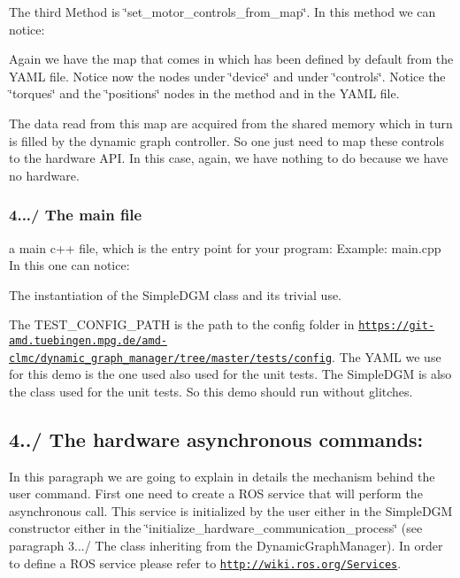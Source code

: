 The third Method is \char`\"{}set\+\_\+motor\+\_\+controls\+\_\+from\+\_\+map\char`\"{}.  In this method we can notice\+:
\begin{DoxyItemize}
\item Again we have the map that comes in which has been defined by default from the Y\+A\+ML file. Notice now the nodes under \char`\"{}device\char`\"{} and under \char`\"{}controls\char`\"{}. Notice the \char`\"{}torques\char`\"{} and the \char`\"{}positions\char`\"{} nodes in the method and in the Y\+A\+ML file.
\item The data read from this map are acquired from the shared memory which in turn is filled by the dynamic graph controller. So one just need to map these controls to the hardware A\+PI. In this case, again, we have nothing to do because we have no hardware.
\end{DoxyItemize}\hypertarget{subsubpage_implement_dgm_dgm_impl_sec_main}{}\subsubsection{4.../ The main file}\label{subsubpage_implement_dgm_dgm_impl_sec_main}
a main c++ file, which is the entry point for your program\+: Example\+: main.\+cpp  In this one can notice\+:
\begin{DoxyItemize}
\item The instantiation of the Simple\+D\+GM class and its trivial use.
\item The T\+E\+S\+T\+\_\+\+C\+O\+N\+F\+I\+G\+\_\+\+P\+A\+TH is the path to the config folder in \href{https://git-amd.tuebingen.mpg.de/amd-clmc/dynamic_graph_manager/tree/master/tests/config}{\tt https\+://git-\/amd.\+tuebingen.\+mpg.\+de/amd-\/clmc/dynamic\+\_\+graph\+\_\+manager/tree/master/tests/config}. The Y\+A\+ML we use for this demo is the one used also used for the unit tests. The Simple\+D\+GM is also the class used for the unit tests. So this demo should run without glitches.
\end{DoxyItemize}\hypertarget{subsubpage_implement_dgm_dgm_impl_sec_hwc_commands}{}\subsection{4../ The hardware asynchronous commands\+:}\label{subsubpage_implement_dgm_dgm_impl_sec_hwc_commands}
In this paragraph we are going to explain in details the mechanism behind the user command. First one need to create a R\+OS service that will perform the asynchronous call. This service is initialized by the user either in the Simple\+D\+GM constructor either in the \char`\"{}initialize\+\_\+hardware\+\_\+communication\+\_\+process\char`\"{} (see paragraph 3.../ The class inheriting from the Dynamic\+Graph\+Manager). In order to define a R\+OS service please refer to \href{http://wiki.ros.org/Services}{\tt http\+://wiki.\+ros.\+org/\+Services}.

